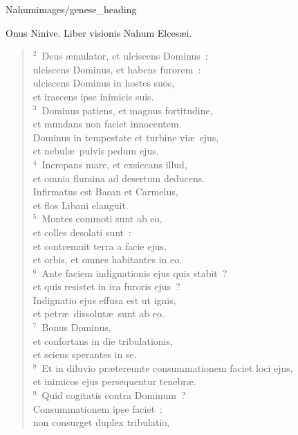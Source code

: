 {Nahum}{images/genese_heading}


\lettrine[lines=10,image=true,loversize=0.05,lraise=-0.03]{O}{}nus Ninive. Liber visionis Nahum Elces\ae i.


\begin{flushleft}\begin{verse}\vspace{6pt}${}^{2}$~Deus \ae mulator, et ulciscens Dominus~:\\ ulciscens Dominus, et habens furorem~:\\ ulciscens Dominus in hostes suos,\\ et irascens ipse inimicis suis.\\
${}^{3}$~Dominus patiens, et magnus fortitudine,\\ et mundans non faciet innocentem.\\ Dominus in tempestate et turbine vi\ae\ ejus,\\ et nebul\ae\ pulvis pedum ejus.\\
${}^{4}$~Increpans mare, et exsiccans illud,\\ et omnia flumina ad desertum deducens.\\ Infirmatus est Basan et Carmelus,\\ et flos Libani elanguit.\\
${}^{5}$~Montes commoti sunt ab eo,\\ et colles desolati sunt~:\\ et contremuit terra a facie ejus,\\ et orbis, et omnes habitantes in eo.\\
${}^{6}$~Ante faciem indignationis ejus quis stabit~?\\ et quis resistet in ira furoris ejus~?\\ Indignatio ejus effusa est ut ignis,\\ et petr\ae\ dissolut\ae\ sunt ab eo.\\
${}^{7}$~Bonus Dominus,\\ et confortans in die tribulationis,\\ et sciens sperantes in se.\\
${}^{8}$~Et in diluvio pr\ae tereunte consummationem faciet loci ejus,\\ et inimicos ejus persequentur tenebr\ae .\\
${}^{9}$~Quid cogitatis contra Dominum~?\\ Consummationem ipse faciet~:\\ non consurget duplex tribulatio,\\

\end{verse}
\end{flushleft}
